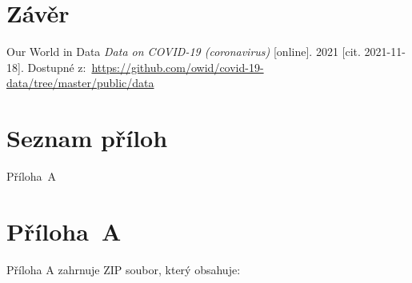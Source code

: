 \documentclass[a4paper]{ article}
\begin{document}

\clearpage {} {}
\section*{Závěr}


\clearpage {} {}

\begin{thebibliography}{99}	%


Our World in Data
\textit{Data on COVID-19 (coronavirus)} [online]. 2021 [cit. 2021-11-18]. Dostupné z:~\url{https://github.com/owid/covid-19-data/tree/master/public/data}

\end{thebibliography}


\clearpage {} {}
\section*{Seznam příloh}

\noindent Příloha~A \dotfill \pageref{1}


\clearpage {}\label{prilohaA} 
\section*{Příloha~A}

Příloha A zahrnuje ZIP soubor, který obsahuje: 

\end{document}
